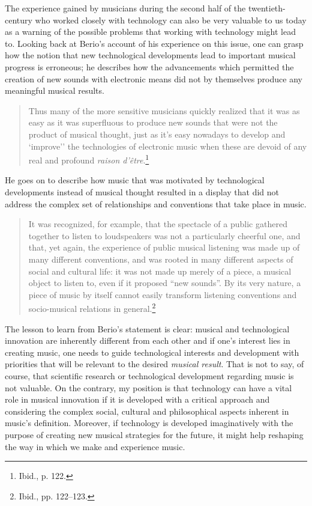 The experience gained by musicians during the second half of the twentieth-century who worked closely with technology can also be very valuable to us today as a warning of the possible problems that working with technology might lead to. Looking back at Berio's account of his experience on this issue, one can grasp how the notion that new technological developments lead to important musical progress is erroneous; he describes how the advancements which permitted the creation of new sounds with electronic means did not by themselves produce any meaningful musical results. 
\begin{quote}
Thus many of the more sensitive musicians quickly realized that it was as easy as it was superfluous to produce new sounds that were not the product of musical thought, just as it's easy nowadays to develop and `improve'' the technologies of electronic music when these are devoid of any real and profound \emph{raison d'\^{e}tre}.\footnote{Ibid., p. 122.}
\end{quote}
He goes on to describe how music that was motivated by technological developments instead of musical thought resulted in a display that did not address the complex set of relationships and conventions that take place in music.
\begin{quote}
It was recognized, for example, that the spectacle of a public gathered together to listen to loudspeakers was not a particularly cheerful one, and that, yet again, the experience of public musical listening was made up of many different conventions, and was rooted in many different aspects of social and cultural life: it was not made up merely of a piece, a musical object to listen to, even if it proposed ``new sounds''. By its very nature, a piece of music by itself cannot easily transform listening conventions and socio-musical relations in general.\footnote{Ibid., pp. 122--123.}
\end{quote}
The lesson to learn from Berio's statement is clear: musical and technological innovation are inherently different from each other and if one's interest lies in creating music, one needs to guide technological interests and development with priorities that will be relevant to the desired \emph{musical result}. That is not to say, of course, that scientific research or technological development regarding music is not valuable. On the contrary, my position is that technology can have a vital role in musical innovation if it is developed with a critical approach and considering the complex social, cultural and philosophical aspects inherent in music's definition. Moreover, if technology is developed imaginatively with the purpose of creating new musical strategies for the future, it might help reshaping the way in which we make and experience music.

